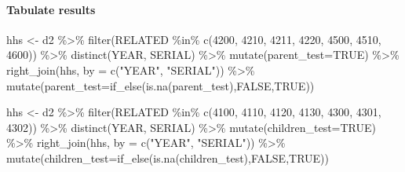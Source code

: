 \documentclass[
]{book}
\newenvironment{Shaded}{\begin{snugshade}}{\end{snugshade}}
\newcommand{\AttributeTok}[1]{\textcolor[rgb]{0.77,0.63,0.00}{#1}}
\newcommand{\ConstantTok}[1]{\textcolor[rgb]{0.00,0.00,0.00}{#1}}
\newcommand{\DecValTok}[1]{\textcolor[rgb]{0.00,0.00,0.81}{#1}}
\newcommand{\FunctionTok}[1]{\textcolor[rgb]{0.00,0.00,0.00}{#1}}
\newcommand{\NormalTok}[1]{#1}
\newcommand{\OtherTok}[1]{\textcolor[rgb]{0.56,0.35,0.01}{#1}}
\newcommand{\SpecialCharTok}[1]{\textcolor[rgb]{0.00,0.00,0.00}{#1}}
\newcommand{\StringTok}[1]{\textcolor[rgb]{0.31,0.60,0.02}{#1}}
\begin{document}
\hypertarget{tabulate-results}{%
\paragraph{Tabulate results}\label{tabulate-results}}

\begin{Shaded}
\begin{Highlighting}[]
\NormalTok{  hhs }\OtherTok{\textless{}{-}}\NormalTok{ d2 }\SpecialCharTok{\%\textgreater{}\%} \FunctionTok{filter}\NormalTok{(RELATED }\SpecialCharTok{\%in\%} \FunctionTok{c}\NormalTok{(}\DecValTok{4200}\NormalTok{, }\DecValTok{4210}\NormalTok{, }\DecValTok{4211}\NormalTok{, }\DecValTok{4220}\NormalTok{, }\DecValTok{4500}\NormalTok{, }\DecValTok{4510}\NormalTok{, }\DecValTok{4600}\NormalTok{)) }\SpecialCharTok{\%\textgreater{}\%} \FunctionTok{distinct}\NormalTok{(YEAR, SERIAL) }\SpecialCharTok{\%\textgreater{}\%} \FunctionTok{mutate}\NormalTok{(}\AttributeTok{parent\_test=}\ConstantTok{TRUE}\NormalTok{) }\SpecialCharTok{\%\textgreater{}\%} \FunctionTok{right\_join}\NormalTok{(hhs, }\AttributeTok{by =} \FunctionTok{c}\NormalTok{(}\StringTok{"YEAR"}\NormalTok{, }\StringTok{"SERIAL"}\NormalTok{)) }\SpecialCharTok{\%\textgreater{}\%} \FunctionTok{mutate}\NormalTok{(}\AttributeTok{parent\_test=}\FunctionTok{if\_else}\NormalTok{(}\FunctionTok{is.na}\NormalTok{(parent\_test),}\ConstantTok{FALSE}\NormalTok{,}\ConstantTok{TRUE}\NormalTok{))}


\NormalTok{  hhs }\OtherTok{\textless{}{-}}\NormalTok{ d2 }\SpecialCharTok{\%\textgreater{}\%} \FunctionTok{filter}\NormalTok{(RELATED }\SpecialCharTok{\%in\%} \FunctionTok{c}\NormalTok{(}\DecValTok{4100}\NormalTok{, }\DecValTok{4110}\NormalTok{, }\DecValTok{4120}\NormalTok{, }\DecValTok{4130}\NormalTok{, }\DecValTok{4300}\NormalTok{, }\DecValTok{4301}\NormalTok{, }\DecValTok{4302}\NormalTok{)) }\SpecialCharTok{\%\textgreater{}\%} \FunctionTok{distinct}\NormalTok{(YEAR, SERIAL) }\SpecialCharTok{\%\textgreater{}\%} \FunctionTok{mutate}\NormalTok{(}\AttributeTok{children\_test=}\ConstantTok{TRUE}\NormalTok{) }\SpecialCharTok{\%\textgreater{}\%} \FunctionTok{right\_join}\NormalTok{(hhs, }\AttributeTok{by =} \FunctionTok{c}\NormalTok{(}\StringTok{"YEAR"}\NormalTok{, }\StringTok{"SERIAL"}\NormalTok{)) }\SpecialCharTok{\%\textgreater{}\%} \FunctionTok{mutate}\NormalTok{(}\AttributeTok{children\_test=}\FunctionTok{if\_else}\NormalTok{(}\FunctionTok{is.na}\NormalTok{(children\_test),}\ConstantTok{FALSE}\NormalTok{,}\ConstantTok{TRUE}\NormalTok{))}
  

\end{Highlighting}
\end{Shaded}
\end{document}
